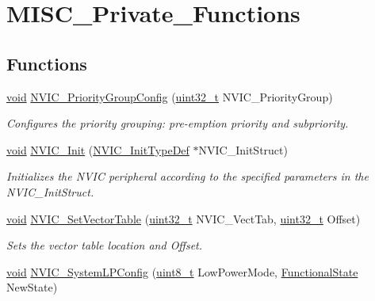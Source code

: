 \hypertarget{group___m_i_s_c___private___functions}{}\section{M\+I\+S\+C\+\_\+\+Private\+\_\+\+Functions}
\label{group___m_i_s_c___private___functions}
\subsection*{Functions}
\begin{DoxyCompactItemize}
\item 
\hyperlink{usb__devapi_8h_afabf60e7f57651d6d595a02c75f07cd0}{void} \hyperlink{group___m_i_s_c___private___functions_gadfb1f34f803ce54c976643db8c484442}{N\+V\+I\+C\+\_\+\+Priority\+Group\+Config} (\hyperlink{_p_e___types_8h_a33594304e786b158f3fb30289278f5af}{uint32\+\_\+t} N\+V\+I\+C\+\_\+\+Priority\+Group)
\begin{DoxyCompactList}\small\item\em Configures the priority grouping\+: pre-\/emption priority and subpriority. \end{DoxyCompactList}\item 
\hyperlink{usb__devapi_8h_afabf60e7f57651d6d595a02c75f07cd0}{void} \hyperlink{group___m_i_s_c___private___functions_ga4ab373ed0870c06fca5eb51d639adf41}{N\+V\+I\+C\+\_\+\+Init} (\hyperlink{struct_n_v_i_c___init_type_def}{N\+V\+I\+C\+\_\+\+Init\+Type\+Def} $\ast$N\+V\+I\+C\+\_\+\+Init\+Struct)
\begin{DoxyCompactList}\small\item\em Initializes the N\+V\+IC peripheral according to the specified parameters in the N\+V\+I\+C\+\_\+\+Init\+Struct. \end{DoxyCompactList}\item 
\hyperlink{usb__devapi_8h_afabf60e7f57651d6d595a02c75f07cd0}{void} \hyperlink{group___m_i_s_c___private___functions_ga1145208ad70edfc2fab19b8b8ef1b1a1}{N\+V\+I\+C\+\_\+\+Set\+Vector\+Table} (\hyperlink{_p_e___types_8h_a33594304e786b158f3fb30289278f5af}{uint32\+\_\+t} N\+V\+I\+C\+\_\+\+Vect\+Tab, \hyperlink{_p_e___types_8h_a33594304e786b158f3fb30289278f5af}{uint32\+\_\+t} Offset)
\begin{DoxyCompactList}\small\item\em Sets the vector table location and Offset. \end{DoxyCompactList}\item 
\hyperlink{usb__devapi_8h_afabf60e7f57651d6d595a02c75f07cd0}{void} \hyperlink{group___m_i_s_c___private___functions_gae21011c5232f5b8f366acbecd12a1d4a}{N\+V\+I\+C\+\_\+\+System\+L\+P\+Config} (\hyperlink{_p_e___types_8h_aba7bc1797add20fe3efdf37ced1182c5}{uint8\+\_\+t} Low\+Power\+Mode, \hyperlink{agilefox_2library_2inc_2stm32f10x__type_8h_ac9a7e9a35d2513ec15c3b537aaa4fba1}{Functional\+State} New\+State)

\end{DoxyCompactItemize}
